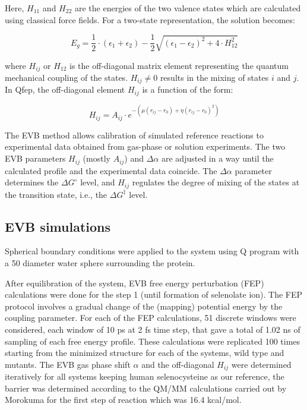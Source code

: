 \documentclass{article}
\begin{document}
Here, \(H_{11}\) and \(H_{22}\) are the energies of the two valence states which are calculated using classical force fields. 
For a two-state representation, the solution becomes:

\begin{equation}
    E_g = \frac{1}{2} \cdot \left( \epsilon_1 + \epsilon_2 \right) - \frac{1}{2} \sqrt{ \left( \epsilon_1 - \epsilon_2 \right)^2 + 4 \cdot H_{12}^2 }
\end{equation}

where \(H_{ij}\) or \(H_{12}\) is the off-diagonal matrix element representing the quantum mechanical coupling of the states. \(H_{ij} \neq 0\) results in the mixing of states \(i\) and \(j\). In Qfep, the off-diagonal element \(H_{ij}\) is a function of the form:

\begin{equation}
    H_{ij} = A_{ij} \cdot e^{-(\mu (r_{ij} - r_0) + \eta (r_{ij} - r_0)^2)}
\end{equation}

The EVB method allows calibration of simulated reference reactions to experimental data obtained from gas-phase or solution experiments. The two EVB parameters \(H_{ij}\) (mostly \(A_{ij}\)) and \(\Delta \alpha\) are adjusted in a way until the calculated profile and the experimental data coincide. The \(\Delta \alpha\) parameter determines the \(\Delta G^\circ\) level, and \(H_{ij}\) regulates the degree of mixing of the states at the transition state, i.e., the \(\Delta G^\ddagger\) level.

\subsection{EVB simulations}

Spherical boundary conditions \cite{King1989} were applied to the system using Q program \cite{Marelius1999} with a 50 \text{\AA} diameter water sphere surrounding the protein.

After equilibration of the system, EVB free energy perturbation (FEP) calculations were done for the step 1 (until formation of selenolate ion). The FEP protocol involves a gradual change of the (mapping) potential energy by the coupling parameter. For each of the FEP calculations, 51 discrete windows were considered, each window of 10 ps at 2 fs time step, that gave a total of 1.02 ns of sampling of each free energy profile. These calculations were replicated 100 times starting from the minimized structure for each of the systems, wild type and mutants. The EVB gas phase shift $\alpha$ and the off-diagonal \(H_{ij}\) were determined iteratively for all systems keeping human selenocysteine as our reference, the barrier was determined according to the QM/MM calculations carried out by Morokuma \cite{Prabhakar2006} for the first step of reaction which was 16.4 kcal/mol.



\end{document}
